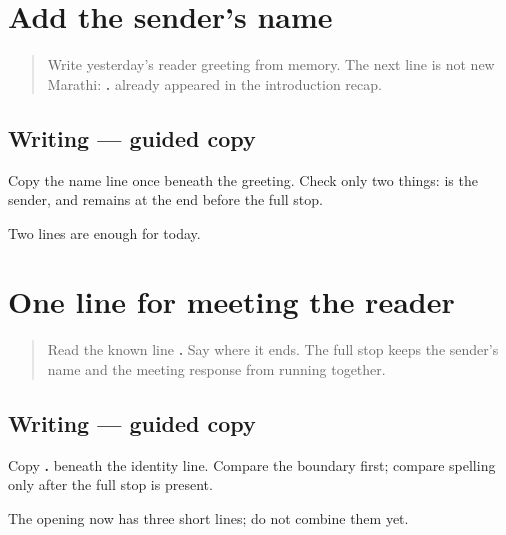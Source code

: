\section[mājhaṁ nāv Aruṇ āhe]{Add the sender's name}

\label{lesson:MR-A1M02-name-line}



\begin{quote}
Write yesterday's reader greeting from memory. The next line is not new Marathi: \textbf{   .} already appeared in the introduction recap.
\end{quote}

\subsection*{Writing — guided copy}
Copy the name line once beneath the greeting. Check only two things: \textbf{} is the sender, and \textbf{} remains at the end before the full stop.

\begin{tcolorbox}[breakable,colback=teal!4,colframe=teal!35!black,title={Before you move on}]
Two lines are enough for today.
\end{tcolorbox}
\section[bheṭūn ānand jhālā]{One line for meeting the reader}

\label{lesson:MR-A1M03-meeting-line}



\begin{quote}
Read the known line \textbf{  .} Say where it ends. The full stop keeps the sender's name and the meeting response from running together.
\end{quote}

\subsection*{Writing — guided copy}
Copy \textbf{  .} beneath the identity line. Compare the boundary first; compare spelling only after the full stop is present.

\begin{tcolorbox}[breakable,colback=teal!4,colframe=teal!35!black,title={Before you move on}]
The opening now has three short lines; do not combine them yet.
\end{tcolorbox}
